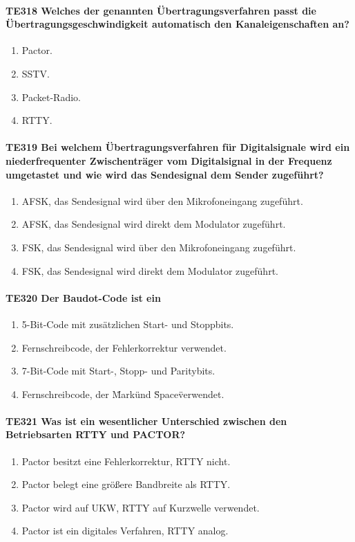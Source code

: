 \documentclass[8pt]{article}
\begin{document}
\begin{enumerate}
\begin{enumerate}[nolistsep,label=\Alph*]
\paragraph*{TE318 Welches der genannten Übertragungsverfahren passt die Übertragungsgeschwindigkeit automatisch den Kanaleigenschaften an?}
\begin{enumerate}[nolistsep,label=\Alph*]
\item Pactor.
\item SSTV.
\item Packet-Radio.
\item RTTY.
\end{enumerate}

\paragraph*{TE319 Bei welchem Übertragungsverfahren für Digitalsignale wird ein niederfrequenter Zwischenträger vom Digitalsignal in der Frequenz umgetastet und wie wird das Sendesignal dem Sender zugeführt?}
\begin{enumerate}[nolistsep,label=\Alph*]
\item AFSK, das Sendesignal wird über den Mikrofoneingang zugeführt. 
\item AFSK, das Sendesignal wird direkt dem Modulator zugeführt.
\item FSK, das Sendesignal wird über den Mikrofoneingang zugeführt.
\item FSK, das Sendesignal wird direkt dem Modulator zugeführt.
\end{enumerate}

\paragraph*{TE320 Der Baudot-Code ist ein}
\begin{enumerate}[nolistsep,label=\Alph*]
\item 5-Bit-Code mit zusätzlichen Start- und Stoppbits.
\item Fernschreibcode, der Fehlerkorrektur verwendet.
\item 7-Bit-Code mit Start-, Stopp- und Paritybits.
\item Fernschreibcode, der \"Mark\" und \"Space\" verwendet.
\end{enumerate}

\paragraph*{TE321 Was ist ein wesentlicher Unterschied zwischen den Betriebsarten RTTY und PACTOR?}
\begin{enumerate}[nolistsep,label=\Alph*]
\item Pactor besitzt eine Fehlerkorrektur, RTTY nicht.
\item Pactor belegt eine größere Bandbreite als RTTY.
\item Pactor wird auf UKW, RTTY auf Kurzwelle verwendet.
\item Pactor ist ein digitales Verfahren, RTTY analog.
\end{enumerate}


\end{enumerate}
\end{enumerate}
\end{document}
